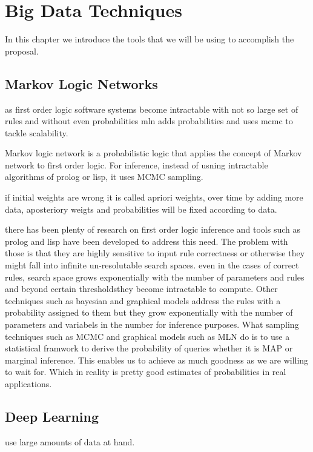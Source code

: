 \chapter{Big Data Techniques}
\label{chapter:Big Data Techniques}


In this chapter we introduce the tools that we will be using to accomplish the proposal.

\section{Markov Logic Networks}
as first order logic software systems become intractable with not so large set of rules and without even probabilities mln adds probabilities and uses mcmc to tackle scalability.


Markov logic network is a probabilistic logic that applies the concept of Markov network to first order logic. For inference, instead of usning intractable algorithms of prolog or lisp, it uses MCMC sampling.

if initial weights are wrong it is called apriori weights, over time by adding more data, aposteriory weigts and probabilities will be fixed according to data.

there has been plenty of research on first order logic inference and tools such as prolog and lisp have been developed to address this need. The problem with those is that they are highly sensitive to input rule correctness or otherwise they might fall into infinite un-resolutable search spaces. even in the cases of correct rules, search space grows exponentially with the number of parameters and rules and beyond certain thresholdsthey become intractable to compute. Other techniques such as bayesian and graphical models address the rules with a probability assigned to them but they grow exponentially with the number of parameters and variabels in the number for inference purposes. What sampling techniques such as MCMC and graphical models such as MLN do is to use a statistical framwork to derive the probability of queries whether it is MAP or marginal inference. This enables us to achieve as much goodness as we are willing to wait for. Which in reality is pretty good estimates of probabilities in real applications.

\section{Deep Learning}
use large amounts of data at hand.